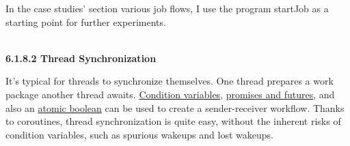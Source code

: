 In the case studies’ section various job flows, I use the program startJob as a starting point for further experiments.

\hspace*{\fill} \\ %
\noindent
\textbf{6.1.8.2\hspace{0.2cm} Thread Synchronization}

It’s typical for threads to synchronize themselves. One thread prepares a work package another thread awaits. \href{https://en.cppreference.com/w/cpp/thread/condition_variable}{Condition variables}, \href{https://en.cppreference.com/w/cpp/thread}{promises and futures}, and also an \href{https://en.cppreference.com/w/cpp/atomic/atomic}{atomic boolean} can be used to create a sender-receiver workflow. Thanks to coroutines, thread synchronization is quite easy, without the inherent risks of condition variables, such as spurious wakeups and lost wakeups.

